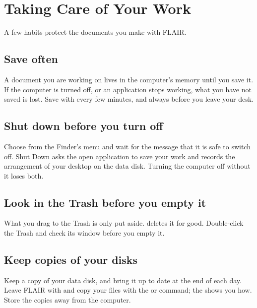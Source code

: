 \chapter{Taking Care of Your Work}

A few habits protect the documents you make with FLAIR.

\section{Save often}
A document you are working on lives in the computer's memory until you save
it.  If the computer is turned off, or an application stops working, what
you have not saved is lost.  Save with  every few minutes, and
always before you leave your desk.

\section{Shut down before you turn off}
Choose  from the Finder's  menu and
wait for the message that it is safe to switch off.  Shut Down asks the
open application to save your work and records the arrangement of your
desktop on the data disk.  Turning the computer off without it loses both.

\section{Look in the Trash before you empty it}
What you drag to the Trash is only put aside.  
deletes it for good.  Double-click the Trash and check its window before
you empty it.

\section{Keep copies of your disks}
Keep a copy of your data disk, and bring it up to date at the end of each
day.  Leave FLAIR with  and copy your files
with the  or  command; the  shows you how.  Store the copies away from the computer.

